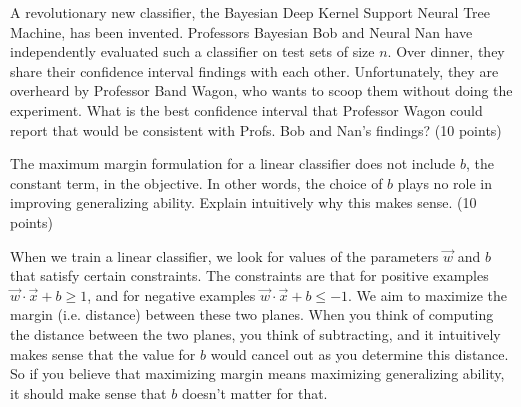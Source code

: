 \documentclass[fleqn]{homework}
\begin{document}
  \begin{problem}{4}
    \begin{question}
      A revolutionary new classifier, the Bayesian Deep Kernel Support Neural
      Tree Machine, has been invented.  Professors Bayesian Bob and Neural Nan
      have independently evaluated such a classifier on test sets of size $n$.
      Over dinner, they share their confidence interval findings with each
      other.  Unfortunately, they are overheard by Professor Band Wagon, who
      wants to scoop them without doing the experiment.  What is the best
      confidence interval that Professor Wagon could report that would be
      consistent with Profs. Bob and Nan's findings? (10 points)
    \end{question}
  \end{problem}

  \begin{problem}{5}
    \begin{question}
      The maximum margin formulation for a linear classifier does not include
      $b$, the constant term, in the objective.  In other words, the choice of
      $b$ plays no role in improving generalizing ability.  Explain intuitively
      why this makes sense. (10 points)
    \end{question}

    When we train a linear classifier, we look for values of the parameters
    $\vec{w}$ and $b$ that satisfy certain constraints.  The constraints are
    that for positive examples $\vec{w}\cdot\vec{x} + b \ge 1$, and for negative
    examples $\vec{w}\cdot\vec{x} + b \le -1$.  We aim to maximize the margin
    (i.e. distance) between these two planes.  When you think of computing the
    distance between the two planes, you think of subtracting, and it
    intuitively makes sense that the value for $b$ would cancel out as you
    determine this distance.  So if you believe that maximizing margin means
    maximizing generalizing ability, it should make sense that $b$ doesn't
    matter for that.
 \end{problem}
\end{document}
